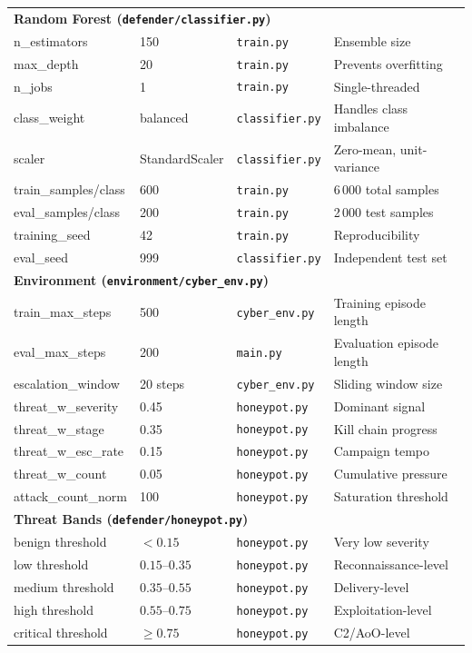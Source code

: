 \begin{longtable}{p{3.8cm}p{2.6cm}p{3.5cm}p{3.2cm}}
  \multicolumn{4}{l}{\textbf{Random Forest (\texttt{defender/classifier.py})}} \\[3pt]
  n\_estimators      & 150         & \texttt{train.py}    & Ensemble size \\
  max\_depth         & 20          & \texttt{train.py}    & Prevents overfitting \\
  n\_jobs            & 1           & \texttt{train.py}    & Single-threaded \\
  class\_weight      & balanced    & \texttt{classifier.py} & Handles class imbalance \\
  scaler             & StandardScaler & \texttt{classifier.py} & Zero-mean, unit-variance \\
  train\_samples/class & 600       & \texttt{train.py}    & 6\,000 total samples \\
  eval\_samples/class  & 200       & \texttt{train.py}    & 2\,000 test samples \\
  training\_seed     & 42          & \texttt{train.py}    & Reproducibility \\
  eval\_seed         & 999         & \texttt{classifier.py} & Independent test set \\[6pt]

  \multicolumn{4}{l}{\textbf{Environment (\texttt{environment/cyber\_env.py})}} \\[3pt]
  train\_max\_steps    & 500       & \texttt{cyber\_env.py} & Training episode length \\
  eval\_max\_steps     & 200       & \texttt{main.py}     & Evaluation episode length \\
  escalation\_window   & 20 steps  & \texttt{cyber\_env.py} & Sliding window size \\
  threat\_w\_severity  & 0.45      & \texttt{honeypot.py} & Dominant signal \\
  threat\_w\_stage     & 0.35      & \texttt{honeypot.py} & Kill chain progress \\
  threat\_w\_esc\_rate & 0.15      & \texttt{honeypot.py} & Campaign tempo \\
  threat\_w\_count     & 0.05      & \texttt{honeypot.py} & Cumulative pressure \\
  attack\_count\_norm  & 100       & \texttt{honeypot.py} & Saturation threshold \\[6pt]

  \multicolumn{4}{l}{\textbf{Threat Bands (\texttt{defender/honeypot.py})}} \\[3pt]
  benign threshold   & $< 0.15$    & \texttt{honeypot.py} & Very low severity \\
  low threshold      & $0.15$--$0.35$ & \texttt{honeypot.py} & Reconnaissance-level \\
  medium threshold   & $0.35$--$0.55$ & \texttt{honeypot.py} & Delivery-level \\
  high threshold     & $0.55$--$0.75$ & \texttt{honeypot.py} & Exploitation-level \\
  critical threshold & $\geq 0.75$ & \texttt{honeypot.py} & C2/AoO-level \\[6pt]


\end{longtable}

